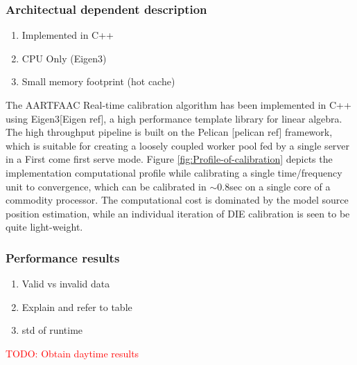 \documentclass{aa}
\begin{document}
\subsubsection{Architectual dependent description}
\begin{enumerate}
\item{Implemented in C++}
\item{CPU Only (Eigen3)}
\item{Small memory footprint (hot cache)}
\end{enumerate}
The AARTFAAC Real-time  calibration algorithm has been implemented  in C++ using
Eigen3{[}Eigen  ref{]},   a  high   performance  template  library   for  linear
algebra. The high throughput pipeline  is built on the Pelican {[}pelican ref{]}
framework, which is suitable for creating a loosely coupled worker pool fed by a
single    server    in    a    First    come   first    serve    mode.    Figure
\ref{fig:Profile-of-calibration}   depicts   the  implementation   computational
profile while calibrating a single time/frequency unit to convergence, which can
be calibrated  in $\sim$0.8sec on  a single core  of a commodity  processor. The
computational cost is  dominated by the model source  position estimation, while
an individual iteration of DIE calibration is seen to be quite light-weight.

\subsubsection{Performance results}
\begin{enumerate}
\item{Valid vs invalid data}
\item{Explain and refer to table}
\item{std of runtime}
\end{enumerate}
\begin{table}[tbh]

\caption{\label{tab:Performance-results} Overview of the time spent in
calibration function blocks for various datasets (daytime and nighttime). We
measured the overall time (flagging, calibrating, imaging) of a single ACM
to be 250 ms on an Intel(R) Core(TM) i7-2600 CPU @ 3.40GHz per core.}
\end{table}
\textcolor{red}{TODO: Obtain daytime results}
\end{document}

